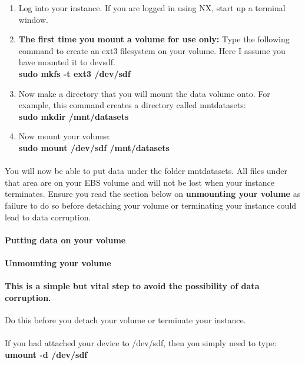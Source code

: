 \begin{enumerate}
\item Log into your instance. If you are logged in using NX, start up a terminal window.
\item \textbf{The first time you mount a volume for use only:} Type the following command to create an ext3 filesystem on your volume. Here I assume you have mounted it to \/dev\/sdf. 
\\\textbf{sudo mkfs -t ext3 /dev/sdf }
\item Now make a directory that you will mount the data volume onto. For example, this command creates a directory called \/mnt\/datasets:
\\\textbf{sudo mkdir /mnt/datasets}
\item Now mount your volume:
\\\textbf{sudo mount /dev/sdf /mnt/datasets}
\end{enumerate}

\paragraph{}You will now be able to put data under the folder \/mnt\/datasets. All files under that area are on your EBS volume and will not be lost when your instance terminates. Ensure you read the section below on \textbf{unmounting your volume} as failure to do so before detaching your volume or terminating your instance could lead to data corruption. 

\paragraph{Putting data on your volume}



\paragraph{Unmounting your volume}

\paragraph{This is a simple but vital step to avoid the possibility of data corruption.} Do this before you detach your volume or terminate your instance.

\paragraph{}If you had attached your device to /dev/sdf, then you simply need to type:
\\\textbf{umount -d /dev/sdf}

